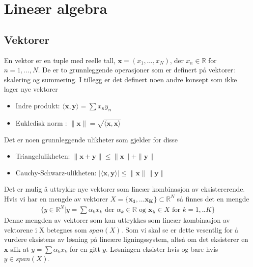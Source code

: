 \chapter{Lineær algebra}
\section{Vektorer}
En vektor er en tuple med reelle tall, $\mathbf{x} = (x_1,...,x_N)$, der $x_n \in \mathbb{R}$ for $n=1,...,N$. De er to grunnleggende operasjoner som er definert på vektorer: skalering og summering. I tillegg er det definert noen andre konsept som ikke lager nye vektorer
\begin{itemize}
\item Indre produkt: $\langle \mathbf{x},\mathbf{y} \rangle = \sum x_ny_n$
\item Eukledisk norm : $\|\mathbf{x}\| = \sqrt{\langle \mathbf{x},\mathbf{x} \rangle}$
\end{itemize}
Det er noen grunnleggende ulikheter som gjelder for disse
\begin{itemize}
\item Triangelulikheten: $\|\mathbf{x}+\mathbf{y} \| \leq \|\mathbf{x}\|+\|\mathbf{y}\|$
\item Cauchy-Schwarz-ulikheten: $|\langle \mathbf{x},\mathbf{y} \rangle | \leq \|\mathbf{x}\|\|\mathbf{y}\|$
\end{itemize}
Det er mulig å uttrykke nye vektorer som lineær kombinasjon av eksistererende. Hvis vi har en mengde av vektorer $X = \{\mathbf{x_1},...\mathbf{x_K}\} \subset \mathbb{R}^N$ så finnes det en mengde 
\begin{align}
\{y\in \mathbb{R}^N|y=\sum \alpha_k x_k \text{ der } \alpha_k \in \mathbb{R} \text{ og } \mathbf{x_k} \in X \text{ for } k=1,..K\}
\end{align}
Denne mengden av vektorer som kan uttrykkes som lineær kombinasjon av vektorene i X betegnes som $span(X)$. Som vi skal se er dette vesentlig for å vurdere eksistens av løsning på lineære ligningssystem, altså om det eksisterer en $\mathbf{x}$ slik at $y = \sum \alpha_k x_k $ for en gitt $y$. Løsningen eksister hvis og bare hvis $y \in span(X)$.

